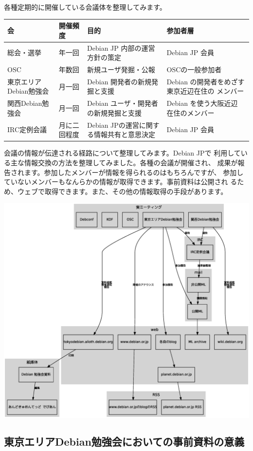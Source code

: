 \documentclass[mingoth,a4paper]{jsarticle}
\begin{document}
各種定期的に開催している会議体を整理してみます。

\begin{tabular}[t]{|l|l|p{14em}|p{12em}|}
\hline
会 & 開催頻度 & 目的 & 参加者層 \\
\hline
総会・選挙 & 年一回 & Debian JP 内部の運営方針の策定 & Debian JP 会員 \\
OSC & 年数回 & 新規ユーザ発掘・公報 & OSCの一般参加者 \\
東京エリアDebian勉強会 & 月一回 & Debian 開発者の新規発掘と支援 & Debian の開発者をめざす東京近辺在住の
 メンバー \\
関西Debian勉強会 & 月一回 & Debian ユーザ・開発者の新規発掘と支援 & Debian を使う大阪近辺
	     在住のメンバー\\
IRC定例会議 & 月に二回程度 & Debian JPの運営に関する情報共有と意思決定 & Debian JP
 会員 \\
\hline
\end{tabular}

会議の情報が伝達される経路について整理してみます。Debian JPで
利用している主な情報交換の方法を整理してみました。各種の会議が開催され、
成果が報告されます。参加したメンバーが情報を得られるのはもちろんですが、
参加していないメンバーもなんらかの情報が取得できます。事前資料は公開され
るため、ウェブで取得できます。また、その他の情報取得の手段があります。

\includegraphics[width=1\hsize]{image200712/debianjpandmedia.eps}


\subsection{東京エリアDebian勉強会においての事前資料の意義}
\end{document}
